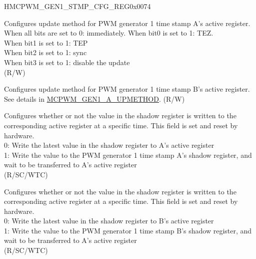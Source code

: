 \begin{register}{H}{MCPWM\_GEN1\_STMP\_CFG\_REG}{0x0074}\label{regdesc:MCPWMGEN1STMPCFGREG}
%
%
%
%
%
\regnewline%
\begin{regdesc}\begin{reglist}
\label{fielddesc:MCPWMGEN1AUPMETHOD}\item [MCPWM\_GEN1\_A\_UPMETHOD] Configures update method for PWM generator 1 time stamp A's active register.
\\When all bits are set to 0: immediately. When bit0 is set to 1: TEZ.
\\When bit1 is set to 1: TEP
\\When bit2 is set to 1: sync
\\When bit3 is set to 1: disable the update
\\(R/W)
\label{fielddesc:MCPWMGEN1BUPMETHOD}\item [MCPWM\_GEN1\_B\_UPMETHOD] Configures update method for PWM generator 1 time stamp B's active register. See details in \hyperref[fielddesc:MCPWMGEN1AUPMETHOD]{MCPWM\_GEN1\_A\_UPMETHOD}. (R/W)
\label{fielddesc:MCPWMGEN1ASHDWFULL}\item [MCPWM\_GEN1\_A\_SHDW\_FULL] Configures whether or not the value in the shadow register is written to the corresponding active register at a specific time. This field is set and reset by hardware. \\
0: Write the latest value in the shadow register to A's active register \\
1: Write the value to the PWM generator 1 time stamp A's shadow register, and wait to be transferred to A's active register \\
(R/SC/WTC)
\label{fielddesc:MCPWMGEN1BSHDWFULL}\item [MCPWM\_GEN1\_B\_SHDW\_FULL] Configures whether or not the value in the shadow register is written to the corresponding active register at a specific time. This field is set and reset by hardware. \\
0: Write the latest value in the shadow register to B's active register \\
1: Write the value to the PWM generator 1 time stamp B's shadow register, and wait to be transferred to A's active register \\
(R/SC/WTC)
\end{reglist}\end{regdesc}
\end{register}


